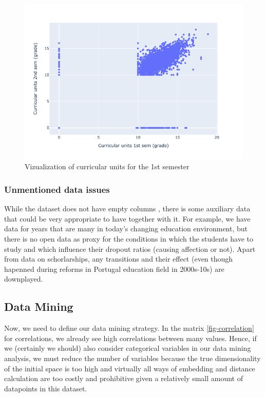 \documentclass[
  letterpaper,
  DIV=11,
  numbers=noendperiod]{scrartcl}
\begin{document}
\begin{figure}

{\centering \includegraphics{report_AzadhdhinNedalYunisAlFraijat_files/figure-pdf/fig-cur-grade-output-1.png}

}

\caption{\label{fig-cur-grade}Vizualization of curricular units for the
1st semester}

\end{figure}

\hypertarget{unmentioned-data-issues}{%
\subsubsection{Unmentioned data issues}\label{unmentioned-data-issues}}

While the dataset does not have empty columns , there is some auxiliary
data that could be very appropriate to have together with it. For
example, we have data for years that are many in today's changing
education environment, but there is no open data as proxy for the
conditions in which the students have to study and which influence their
dropout ratios (causing affection or not). Apart from data on
schorlarships, any transitions and their effect (even though hapenned
during reforms in Portugal education field in 2000s-10s) are downplayed.

\hypertarget{sec-data-mining}{%
\subsection{Data Mining}\label{sec-data-mining}}

Now, we need to define our data mining strategy. In the matrix
\ref{fig-correlation} for correlations, we already see high correlations
between many values. Hence, if we (certainly we should) also consider
categorical variables in our data mining analysis, we must reduce the
number of variables because the true dimensionality of the initial space
is too high and virtually all ways of embedding and distance calculation
are too costly and prohibitive given a relatively small amount of
datapoints in this dataset.
\end{document}
